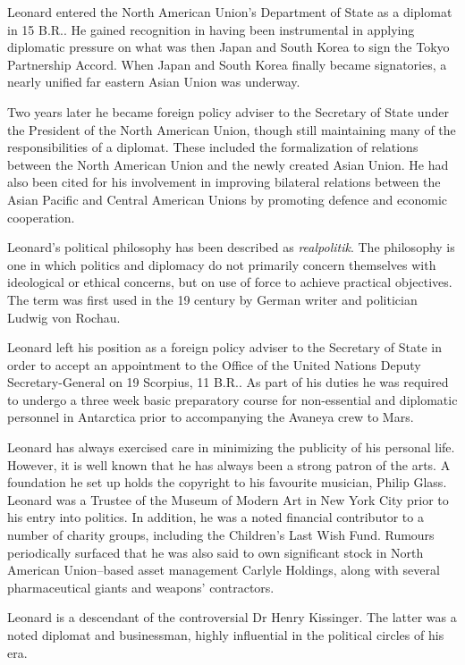 Leonard entered the North American Union's Department of State as a diplomat in 15 B.R.. He gained recognition in having been instrumental in applying diplomatic pressure on what was then Japan and South Korea to sign the Tokyo Partnership Accord. When Japan and South Korea finally became signatories, a nearly unified far eastern Asian Union was underway.

Two years later he became foreign policy adviser to the Secretary of State under the President of the North American Union, though still maintaining many of the responsibilities of a diplomat. These included the formalization of relations between the North American Union and the newly created Asian Union. He had also been cited for his involvement in improving bilateral relations between the Asian Pacific and Central American Unions by promoting defence and economic cooperation.

Leonard's political philosophy has been described as {\it realpolitik}. The philosophy is one in which politics and diplomacy do not primarily concern themselves with ideological or ethical concerns, but on use of force to achieve practical objectives. The term was first used in the 19 century by German writer and politician Ludwig von Rochau.

Leonard left his position as a foreign policy adviser to the Secretary of State in order to accept an appointment to the Office of the United Nations Deputy Secretary-General on 19 Scorpius, 11 B.R.. As part of his duties he was required to undergo a three week basic preparatory course for non-essential and diplomatic personnel in Antarctica prior to accompanying the Avaneya crew to Mars.

Leonard has always exercised care in minimizing the publicity of his personal life. However, it is well known that he has always been a strong patron of the arts. A foundation he set up holds the copyright to his favourite musician, Philip Glass. Leonard was a Trustee of the Museum of Modern Art in New York City prior to his entry into politics. In addition, he was a noted financial contributor to a number of charity groups, including the Children's Last Wish Fund. Rumours periodically surfaced that he was also said to own significant stock in North American Union--based asset management Carlyle Holdings, along with several pharmaceutical giants and weapons' contractors.

Leonard is a descendant of the controversial Dr Henry Kissinger. The latter was a noted diplomat and businessman, highly influential in the political circles of his era.


